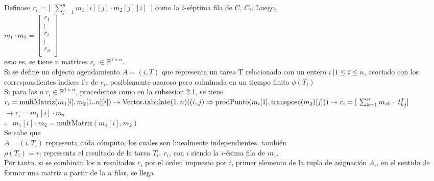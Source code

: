 \documentclass[12pt, a4paper]{article}
\begin{document}
Definase $r_i$ = [~$\sum_{j=1}^{n} m_1[i][j] \cdot m_2[j][i]$~] como la $i$-séptima fila de $C$, $C_i$.
Luego, \\
\begin{math}
   m_1 \cdot m_2 = \begin{bmatrix}
       r_1 \\
       \vdots \\
       r_i \\
       \vdots \\
       r_n
        \\
    \end{bmatrix}
\end{math} \\
esto es, se tiene n matrices $r_i$  $\in \mathbb{R}^{1 \times n}.$ \\
Si se define un objecto agendamiento $A = (i, T)$ que representa un tarea T relacionado con un entero $i~| 1 \leq i \leq n$, 
asociado con los correspondientes indices i's de $r_i$, posiblemente azaroso pero culminada en un tiempo finito $\phi(T_i)$\\
Si para las $n~r_i \in \mathbb{R}^{1 \times n}$, procedemos como en la subsesion 2.1, se tiene \\
\begin{math} r_i = \text{{multMatriz}}(m_1[i], m_2[1..n][i]) \\ \rightarrow
    \text{{Vector.tabulate}}(1, n)((i, j) \Rightarrow \text{{prodPunto}}(m_i[1], \text{{transpose}}(m_2)[j])) \\
    \twoheadrightarrow r_i =[~\sum_{k=1}^{n} m_{ik} \cdot t_{kj}^T]
\end{math}\\
$\rightarrow r_i = m_1[i] \cdot m_2$
\\ $\therefore ~~~m_1[i] \cdot m_2 =\text{{multMatriz}}(m_1[i], m_2)$ \\
Se sabe que \\
$A = (i, T_i)$ representa cada cómputo, los cuales son linealmente independientes, también \\
$\rho(T_i) = r_i$ representa el resultado de la tarea $T_i,~r_i$, con $i$ siendo la $i$-ésima fila de $m_1$. \\
Por tanto, si se combinan los n resultados $r_i$ por el orden impuesto por $i$, primer elemento de la tupla de asignación $A_i$, en el sentido de formar una matriz a partir de la $n$ filas, se llega \\
\end{document}
